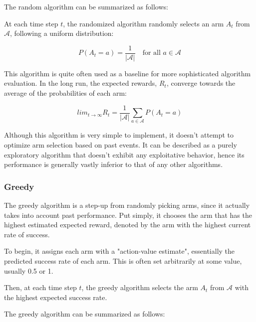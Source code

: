 The random algorithm can be summarized as follows:


At each time step $t$, the randomized algorithm randomly selects an arm $A_t$ from $\mathcal{A}$, following a uniform distribution:

$$P(A_t = a) = \frac{1}{{|\mathcal{A}|}} \quad \text{for all } a \in \mathcal{A}$$

This algorithm is quite often used as a baseline for more sophisticated algorithm evaluation. In the long run, the expected rewards, $R_t$, converge towards the average of the probabilities of each arm:

$$lim_{{t \to \infty}} R_t = \frac{1}{|\mathcal{A}|} \sum_{{a \in \mathcal{A}}} P(A_t = a)$$

Although this algorithm is very simple to implement, it doesn't attempt to optimize arm selection based on past events. It can be described as a purely exploratory algorithm that doesn't exhibit any exploitative behavior, hence its performance is generally vastly inferior to that of any other algorithms.

\subsubsection{Greedy}
\label{sec:Greedy}
The greedy algorithm is a step-up from randomly picking arms, since it actually takes into account past performance. Put simply, it chooses the arm that has the highest estimated expected reward, denoted by the arm with the highest current rate of success.

To begin, it assigns each arm with a "action-value estimate", essentially the predicted success rate of each arm. This is often set arbitrarily at some value, usually 0.5 or 1.

Then, at each time step $t$, the greedy algorithm selects the arm $A_t$ from $\mathcal{A}$ with the highest expected success rate.

The greedy algorithm can be summarized as follows:

